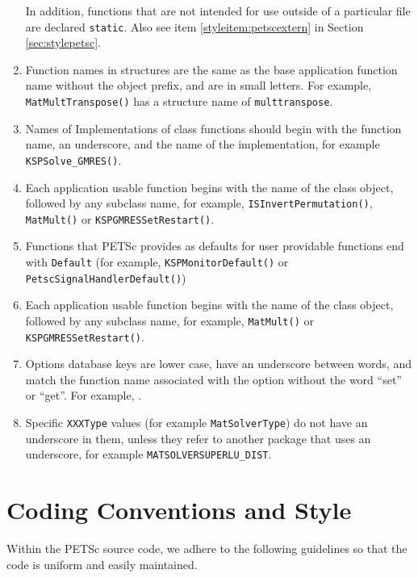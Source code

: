 \begin{enumerate}
      In addition, functions that are not intended for use outside
      of a particular file are declared \lstinline{static}. 
      Also see item \ref{styleitem:petscextern} in Section \ref{sec:stylepetsc}.
\item Function names in structures are the same as the base application
      function name without the object prefix, and are in small letters.
      For example, \lstinline{MatMultTranspose()} has a structure name of
      \lstinline{multtranspose}.
\item Names of Implementations of class functions should begin with the function name, an underscore, and the name of the implementation, for example \lstinline{KSPSolve_GMRES()}.
\item Each application usable function begins with the name of the class object, followed by any subclass name,
  for example, \lstinline{ISInvertPermutation()}, \lstinline{MatMult()} or \lstinline{KSPGMRESSetRestart()}.
\item Functions that PETSc provides as defaults for user providable functions end with \lstinline{Default} (for example, \lstinline{KSPMonitorDefault()} or \lstinline{PetscSignalHandlerDefault()})
\item Each application usable function begins with the name of the class object, followed by any subclass name,
  for example,  \lstinline{MatMult()} or \lstinline{KSPGMRESSetRestart()}.
\item Options database keys are lower case, have an underscore between words, and match the function name associated with the option without the word ``set'' or ``get''.
For example, .
\item Specific \lstinline{XXXType} values (for example \lstinline{MatSolverType}) do not have an underscore in them, unless they refer to another package that uses an underscore, for example \lstinline{MATSOLVERSUPERLU_DIST}.
\end{enumerate}

\section{Coding Conventions and Style}
Within the PETSc source code, we adhere to the following guidelines
so that the code is uniform and easily maintained.

